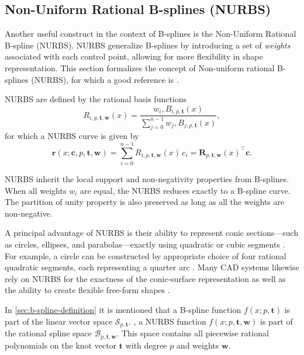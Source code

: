 \subsection{Non-Uniform Rational B-splines (NURBS)}
Another useful construct in the context of B-splines is the Non-Uniform Rational B-spline (NURBS). NURBS generalize B-splines by introducing a set of \emph{weights} associated with each control point, allowing for more flexibility in shape representation.
This section formalizes the concept of Non-uniform rational B-splines (NURBS), for which a good reference is \cite{Piegl1997}. 

NURBS are defined by the rational basis functions
\begin{equation}\label{eq:nurbs-basis}
R_{i,p,\mathbf t, \mathbf w}(x)  = \frac{w_i,B_{i,p,\mathbf t}(x)}{\sum_{j=0}^{n-1}w_j,B_{j,p,\mathbf t}(x)},
\end{equation}
for which a NURBS curve is given by
\begin{equation}\label{eq:nurbs-curve}
\mathbf r(x; \mathbf c, p, \mathbf t, \mathbf w)  = \sum_{i=0}^{n-1}R_{i,p,\mathbf t, \mathbf w}(x)\,c_i
= \mathbf R_{p,\mathbf t, \mathbf w}(x)^\top \mathbf c.
\end{equation}

NURBS inherit the local support and non-negativity properties from B-splines. When all weights $w_i$ are equal, the NURBS reduces exactly to a B-spline curve. The partition of unity property is also preserved as long as all the weights are non-negative. \citep{Piegl1997}

A principal advantage of NURBS is their ability to represent conic sections---such as circles, ellipses, and parabolas---exactly using quadratic or cubic segments \citep{Piegl1997}. For example, a circle can be constructed by appropriate choice of four rational quadratic segments, each representing a quarter arc \citep{DenbighStarkeyNURBS}. Many CAD systems likewise rely on NURBS for the exactness of the conic-surface representation as well as the ability to create flexible free-form shapes \citep{Farin1991,PieglTillerSIGGRAPH,cottrell2009isogeometric}.

In \cref{sec:b-spline-definition} it is mentioned that a B-spline function $f(x; p, \mathbf t)$ is part of the linear vector space $\mathcal S_{p, \mathbf t}$.
, a NURBS function $f(x; p, \mathbf t, \mathbf w)$ is part of the rational spline space $\mathcal B_{p, \mathbf t, \mathbf w}$. This space contains all piecewise rational polynomials on the knot vector $\mathbf t$ with degree $p$ and weights $\mathbf w$. 



